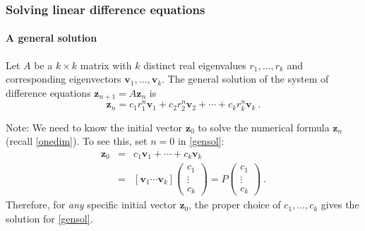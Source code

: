 \documentclass[10pt, handout]{beamer}
\begin{document}
\begin{frame}
\frametitle{Solving linear difference equations}
\framesubtitle{A general solution}
\begin{theorem}[23.6]
Let $A$ be a $k \times k$ matrix with $k$ distinct real eigenvalues $r_1, \ldots, r_k$ and corresponding eigenvectors $\mathbf{v}_1, \ldots, \mathbf{v}_k$. The general solution of the system of difference equations $\mathbf{z}_{n+1} =   A\mathbf{z}_n$ is 
\begin{equation}\label{gensol}
\mathbf{z}_{n} =   c_{1}r_1^n\mathbf{v}_1 + c_{2}r_2^n\mathbf{v}_2 + \cdots + c_{k}r_k^n\mathbf{v}_k ~. 
\end{equation}
\end{theorem} 

\vfill 

Note: We need to know the initial vector $\mathbf{z}_0$ to solve the numerical formula $\mathbf{z}_n$ (recall \eqref{onedim}). To see this, set $n=0$ in \eqref{gensol}:
\begin{eqnarray}
\mathbf{z}_0 &=& c_{1}\mathbf{v}_1 + \cdots + c_{k}\mathbf{v}_k \nonumber \\
&=& [\mathbf{v}_1 \cdots \mathbf{v}_k] \begin{pmatrix}
c_1 \\ \vdots \\ c_k 
\end{pmatrix} = P \begin{pmatrix}
c_1 \\ \vdots \\ c_k 
\end{pmatrix}~.
\end{eqnarray} 
Therefore, for \textit{any} specific initial vector $\mathbf{z}_0$, the proper choice of $c_1, \ldots, c_k$ gives the solution for \eqref{gensol}. %
\end{frame}
\end{document}
